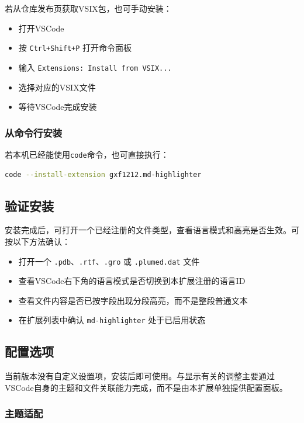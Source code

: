 若从仓库发布页获取VSIX包，也可手动安装：
\begin{itemize}
    \item 打开VSCode
    \item 按 \texttt{Ctrl+Shift+P} 打开命令面板
    \item 输入 \lstinline|Extensions: Install from VSIX...|
    \item 选择对应的VSIX文件
    \item 等待VSCode完成安装
\end{itemize}

\subsubsection{从命令行安装}

若本机已经能使用\lstinline|code|命令，也可直接执行：
\begin{lstlisting}[style=blockstyle,language=bash]
code --install-extension gxf1212.md-highlighter
\end{lstlisting}

\subsection{验证安装}

安装完成后，可打开一个已经注册的文件类型，查看语言模式和高亮是否生效。可按以下方法确认：

\begin{itemize}
    \item 打开一个 \lstinline|.pdb|、\lstinline|.rtf|、\lstinline|.gro| 或 \lstinline|.plumed.dat| 文件
    \item 查看VSCode右下角的语言模式是否切换到本扩展注册的语言ID
    \item 查看文件内容是否已按字段出现分段高亮，而不是整段普通文本
    \item 在扩展列表中确认 \lstinline|md-highlighter| 处于已启用状态
\end{itemize}

\subsection{配置选项}

当前版本没有自定义设置项，安装后即可使用。与显示有关的调整主要通过VSCode自身的主题和文件关联能力完成，而不是由本扩展单独提供配置面板。

\subsubsection{主题适配}

